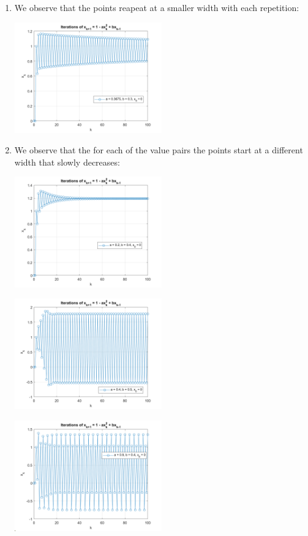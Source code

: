 \documentclass{article}
\begin{document}
\begin{enumerate} [label=\Alph*]
  \newpage
  \item We observe that the points reapeat at a smaller width with each repetition: 
  \begin{center} \includegraphics[width=0.5\textwidth]{Problem3_C.png} \end{center}
  \newpage
  \item We observe that the for each of the value pairs the points start at a different width that slowly decreases:
  \begin{center} \includegraphics[width=0.5\textwidth]{Problem3_D_1.png} \end{center}
  \begin{center} \includegraphics[width=0.5\textwidth]{Problem3_D_2.png} \end{center}
  \begin{center} \includegraphics[width=0.5\textwidth]{Problem3_D_3.png} \end{center}
\end{enumerate}
\end{document}
